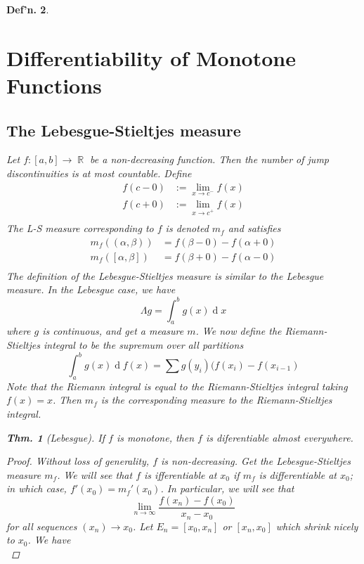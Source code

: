 \documentclass[12pt, a4paper]{book}
\DeclareMathOperator{\R}{\mathbb{R}}
\renewcommand{\d}[1]{\ensuremath{\operatorname{d}\!{#1}}} %
\newtheorem{theorem}{Thm.}[section]
\newtheorem{definition}[theorem]{Def'n.}
\theoremstyle{nonumberplain}
\newtheorem{proof}{Proof}
\begin{document}
\begin{definition}
\section{Differentiability of Monotone Functions}
\subsection{The Lebesgue-Stieltjes measure}
Let $f:[a,b]\to\R$ be a non-decreasing function.
Then the number of jump discontinuities is at most countable.
Define
\begin{align*}
    f(c-0) &:= \lim_{x\to c^-}f(x)\\
    f(c+0) &:= \lim_{x\to c^+}f(x)\\
\end{align*}
The L-S measure corresponding to $f$ is denoted $m_f$ and satisfies
\begin{align*}
    m_f((\alpha,\beta)) &= f(\beta-0)-f(\alpha+0)\\
    m_f([\alpha,\beta]) &= f(\beta+0)-f(\alpha-0)\\
\end{align*}
The definition of the Lebesgue-Stieltjes measure is similar to the Lebesgue measure.
In the Lebesgue case, we have
\[\Lambda g=\int_a^b g(x)\d{x}\]
where $g$ is continuous, and get a measure $m$.
We now define the Riemann-Stieltjes integral to be the supremum over all partitions
\begin{equation*}
    \int_a^b g(x)\d{f(x)} = \sum g(y_i)(f(x_i)-f(x_{i-1})
\end{equation*}
Note that the Riemann integral is equal to the Riemann-Stieltjes integral taking $f(x)=x$.
Then $m_f$ is the corresponding measure to the Riemann-Stieltjes integral.
\begin{theorem}[Lebesgue]
    If $f$ is monotone, then $f$ is diferentiable almost everywhere.
\end{theorem}
\begin{proof}
    Without loss of generality, $f$ is non-decreasing.
    Get the Lebesgue-Stieltjes measure $m_f$.
    We will see that $f$ is ifferentiable at $x_0$ if $m_f$ is differentiable at $x_0$; in which case, $f'(x_0)=m_f'(x_0)$.
    In particular, we will see that
    \begin{equation*}
        \lim_{n\to\infty}\frac{f(x_n)-f(x_0)}{x_n-x_0}
    \end{equation*}
    for all sequences $(x_n)\to x_0$.
    Let $E_n=[x_0,x_n]$ or $[x_n,x_0]$ which shrink nicely to $x_0$.
    We have
    \begin{equation*}

\end{equation*}
\end{proof}
\end{definition}
\end{document}
